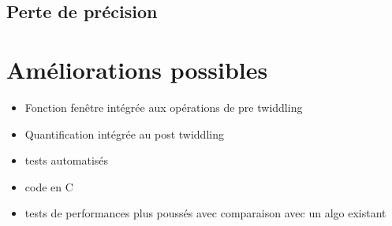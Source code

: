 \documentclass{article}
\begin{document}
 





    \subsection{Perte de précision}




    \newpage
    \section{Améliorations possibles}
    \label{sec:ameliorations}
    \begin{itemize}
        \item Fonction fenêtre intégrée aux opérations de pre twiddling
        \item Quantification intégrée au post twiddling
        \item tests automatisés
        \item code en C
        \item tests de performances plus poussés avec comparaison avec un algo existant
    \end{itemize}


\end{document}
